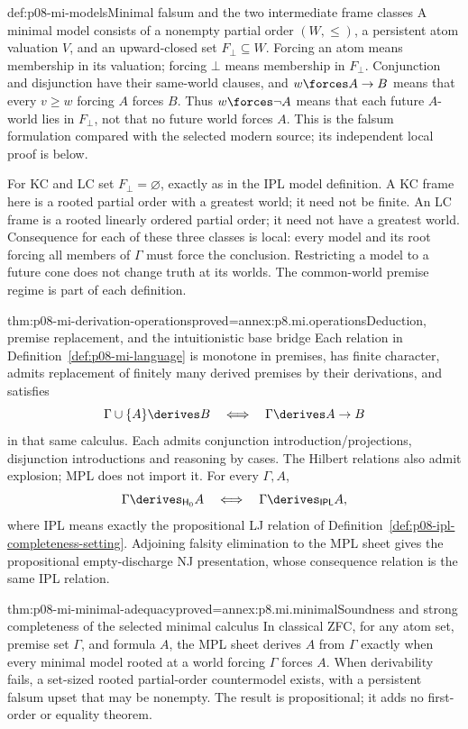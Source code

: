 \begin{hbdefinition}{def:p08-mi-models}{Minimal falsum and the two intermediate frame classes}
A minimal model consists of a nonempty partial order \((W,\leq)\), a
persistent atom valuation \(V\), and an upward-closed set \(F_{\bot}\subseteq W\).
Forcing an atom means membership in its valuation; forcing \(\bot\) means
membership in \(F_{\bot}\). Conjunction and disjunction have their
same-world clauses, and \(w\forces A\to B\) means that every \(v\geq w\)
forcing \(A\) forces \(B\). Thus \(w\forces\neg A\) means that each
future \(A\)-world lies in \(F_{\bot}\), not that no future world forces
\(A\). This is the falsum formulation compared with the selected modern
source; its independent local proof is below.

For KC and LC set \(F_{\bot}=\varnothing\), exactly as in the IPL model
definition. A KC frame here is a rooted partial order with a greatest world;
it need not be finite. An LC frame is a rooted linearly ordered partial
order; it need not have a greatest world. Consequence for each of these
three classes is local: every model and its root forcing all members of
\(\Gamma\) must force the conclusion. Restricting a model to a future cone
does not change truth at its worlds. The common-world premise regime is
part of each definition.
\end{hbdefinition}

\begin{hblemma}{thm:p08-mi-derivation-operations}{proved=annex:p8.mi.operations}{Deduction, premise replacement, and the intuitionistic base bridge}
Each relation in Definition~\ref{def:p08-mi-language} is monotone in
premises, has finite character, admits replacement of finitely many derived
premises by their derivations, and satisfies
\[
 \Gamma\cup\{A\}\derives B\quad\Longleftrightarrow\quad
 \Gamma\derives A\to B
\]
in that same calculus. Each admits conjunction introduction/projections,
disjunction introductions and reasoning by cases. The Hilbert relations
also admit explosion; MPL does not import it.
For every \(\Gamma,A\),
\[
 \Gamma\derives_{\mathsf H_0}A
 \quad\Longleftrightarrow\quad \Gamma\derives_{\mathsf{IPL}}A,
\]
where IPL means exactly the propositional LJ relation of
Definition~\ref{def:p08-ipl-completeness-setting}. Adjoining falsity
elimination to the MPL sheet gives the propositional empty-discharge NJ
presentation, whose consequence relation is the same IPL relation.
\end{hblemma}

\begin{hbtheorem}{thm:p08-mi-minimal-adequacy}{proved=annex:p8.mi.minimal}{Soundness and strong completeness of the selected minimal calculus}
In classical ZFC, for any atom set, premise set \(\Gamma\), and formula
\(A\), the MPL sheet derives \(A\) from \(\Gamma\) exactly when every
minimal model rooted at a world forcing \(\Gamma\) forces \(A\).
When derivability fails, a set-sized rooted partial-order countermodel
exists, with a persistent falsum upset that may be nonempty.
The result is propositional; it adds no first-order or equality theorem.
\end{hbtheorem}

